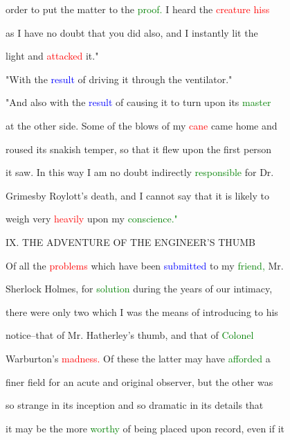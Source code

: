 order to put the matter to the \textcolor{green}{proof.} I heard the \textcolor{red}{creature} \textcolor{red}{hiss}

 as I have no \textcolor{BurntOrange}{doubt} that you did also, and I instantly lit the

 light and \textcolor{red}{attacked} it."



 "With the \textcolor{blue}{result} of driving it through the ventilator."



 "And also with the \textcolor{blue}{result} of causing it to turn upon its \textcolor{green}{master}

 at the other side. Some of the blows of my \textcolor{red}{cane} came home and

 roused its snakish temper, so that it flew upon the first person

 it saw. In this way I am no \textcolor{BurntOrange}{doubt} indirectly \textcolor{green}{responsible} for Dr.

 Grimesby Roylott's \textcolor{BurntOrange}{death,} and I cannot say that it is likely to

 \textcolor{BurntOrange}{weigh} very \textcolor{red}{heavily} upon my \textcolor{green}{conscience."}







 IX. THE \textcolor{BurntOrange}{ADVENTURE} OF THE ENGINEER'S THUMB



 Of all the \textcolor{red}{problems} which have been \textcolor{blue}{submitted} to my \textcolor{green}{friend,} Mr.

 Sherlock Holmes, for \textcolor{green}{solution} during the years of our intimacy,

 there were only two which I was the means of introducing to his

 notice--that of Mr. Hatherley's thumb, and that of \textcolor{green}{Colonel}

 Warburton's \textcolor{red}{madness.} Of these the latter may have \textcolor{green}{afforded} a

 finer field for an acute and original observer, but the other was

 so strange in its inception and so dramatic in its details that

 it may be the more \textcolor{green}{worthy} of being placed upon record, even if it

